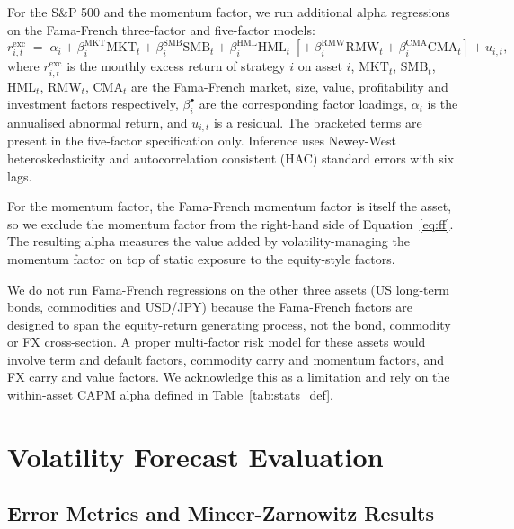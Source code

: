 \documentclass[12pt, a4paper]{article}
\begin{document}
For the S\&P 500 and the momentum factor, we run additional alpha regressions on the
Fama-French three-factor and five-factor models:
\begin{equation}
  r_{i,t}^{\mathrm{exc}} \;=\;
  \alpha_i
  + \beta_{i}^{\mathrm{MKT}} \mathrm{MKT}_t
  + \beta_{i}^{\mathrm{SMB}} \mathrm{SMB}_t
  + \beta_{i}^{\mathrm{HML}} \mathrm{HML}_t
  \;[+\,\beta_{i}^{\mathrm{RMW}} \mathrm{RMW}_t + \beta_{i}^{\mathrm{CMA}} \mathrm{CMA}_t]
  + u_{i,t},
  \label{eq:ff}
\end{equation}
where $r_{i,t}^{\mathrm{exc}}$ is the monthly excess return of strategy $i$ on asset $i$,
$\mathrm{MKT}_t$, $\mathrm{SMB}_t$, $\mathrm{HML}_t$, $\mathrm{RMW}_t$, $\mathrm{CMA}_t$
are the Fama-French market, size, value, profitability and investment factors
respectively, $\beta_i^{\bullet}$ are the corresponding factor loadings, $\alpha_i$ is the
annualised abnormal return, and $u_{i,t}$ is a residual. The bracketed terms are present
in the five-factor specification only. Inference uses Newey-West heteroskedasticity and
autocorrelation consistent (HAC) standard errors with six lags.

For the momentum factor, the Fama-French momentum factor is itself the asset, so we
exclude the momentum factor from the right-hand side of Equation~\eqref{eq:ff}. The
resulting alpha measures the value added by volatility-managing the momentum factor on
top of static exposure to the equity-style factors.

We do not run Fama-French regressions on the other three assets (US long-term bonds,
commodities and USD/JPY) because the Fama-French factors are designed to span the
equity-return generating process, not the bond, commodity or FX cross-section. A proper
multi-factor risk model for these assets would involve term and default factors, commodity
carry and momentum factors, and FX carry and value factors. We acknowledge this as a
limitation and rely on the within-asset CAPM alpha defined in Table~\ref{tab:stats_def}.


\section{Volatility Forecast Evaluation}
\label{sec:forecast}

\subsection{Error Metrics and Mincer-Zarnowitz Results}
\end{document}
